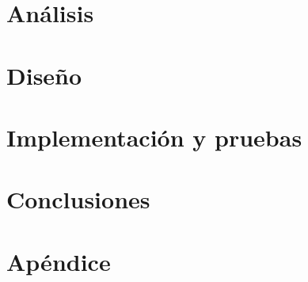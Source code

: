 \documentclass[twoside,spanish,a4paper,12pt]{tfg}
\begin{document}
\chapter{Análisis}


\chapter{Diseño}


\chapter{Implementación y pruebas}

\chapter{Conclusiones}




\pagestyle{appendix}

\appendix
\chapter{Apéndice}




\end{document}
